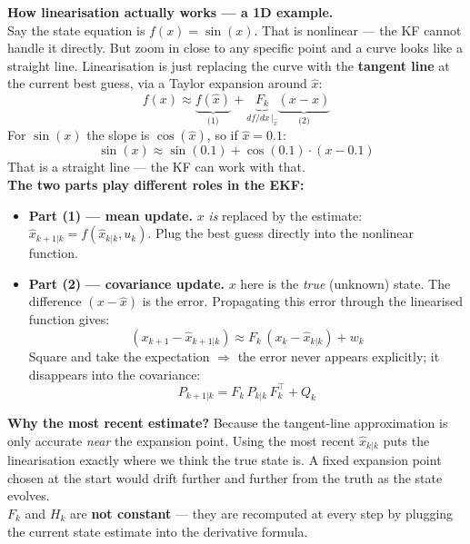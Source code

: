 \documentclass[12pt, a4paper]{article}
\begin{document}
\begin{notebox}
  \textbf{How linearisation actually works --- a 1D example.}\\[4pt]
  Say the state equation is $f(x) = \sin(x)$.
  That is nonlinear --- the KF cannot handle it directly.
  But zoom in close to any specific point and a curve looks like a
  straight line.
  Linearisation is just replacing the curve with the \textbf{tangent
  line} at the current best guess, via a Taylor expansion around
  $\hat{x}$:
  \[
    f(x) \approx \underbrace{f(\hat{x})}_{\text{(1)}}
                 + \underbrace{F_k}_{df/dx\,|_{\hat{x}}}
                   \underbrace{(x - \hat{x})}_{\text{(2)}}
  \]
  For $\sin(x)$ the slope is $\cos(\hat{x})$, so if
  $\hat{x} = 0.1$:
  \[
    \sin(x) \approx \sin(0.1) + \cos(0.1)\cdot(x - 0.1)
  \]
  That is a straight line --- the KF can work with that.\\[6pt]
  \textbf{The two parts play different roles in the EKF:}
  \begin{itemize}[leftmargin=1.4em, topsep=2pt]
    \item \textbf{Part (1) --- mean update.}
          $x$ \emph{is} replaced by the estimate:
          $\hat{x}_{k+1|k} = f(\hat{x}_{k|k}, u_k)$.
          Plug the best guess directly into the nonlinear function.
    \item \textbf{Part (2) --- covariance update.}
          $x$ here is the \emph{true} (unknown) state.
          The difference $(x - \hat{x})$ is the error.
          Propagating this error through the linearised function gives:
          \[
            (x_{k+1} - \hat{x}_{k+1|k})
            \approx F_k\,(x_k - \hat{x}_{k|k}) + w_k
          \]
          Square and take the expectation $\Rightarrow$ the error
          never appears explicitly; it disappears into the covariance:
          \[
            P_{k+1|k} = F_k\,P_{k|k}\,F_k^\top + Q_k
          \]
  \end{itemize}
  \textbf{Why the most recent estimate?}
  Because the tangent-line approximation is only accurate
  \emph{near} the expansion point.
  Using the most recent $\hat{x}_{k|k}$ puts the linearisation
  exactly where we think the true state is.
  A fixed expansion point chosen at the start would drift further
  and further from the truth as the state evolves.\\[4pt]
  $F_k$ and $H_k$ are \textbf{not constant} --- they are recomputed
  at every step by plugging the current state estimate into the
  derivative formula.
\end{notebox}
\end{document}
